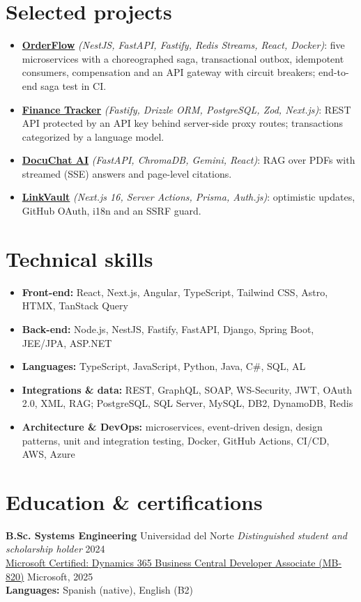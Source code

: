 \documentclass[10pt]{article}
\begin{document}
\section*{Selected projects}
\begin{itemize}
  \item \textbf{\href{https://github.com/MigueIAngel/orderflow}{OrderFlow}} \textit{(NestJS, FastAPI, Fastify, Redis Streams, React, Docker)}: five microservices with a choreographed saga, transactional outbox, idempotent consumers, compensation and an API gateway with circuit breakers; end-to-end saga test in CI.
  \item \textbf{\href{https://github.com/MigueIAngel/finance-tracker}{Finance Tracker}} \textit{(Fastify, Drizzle ORM, PostgreSQL, Zod, Next.js)}: REST API protected by an API key behind server-side proxy routes; transactions categorized by a language model.
  \item \textbf{\href{https://github.com/MigueIAngel/docuchat-ai}{DocuChat AI}} \textit{(FastAPI, ChromaDB, Gemini, React)}: RAG over PDFs with streamed (SSE) answers and page-level citations.
  \item \textbf{\href{https://github.com/MigueIAngel/linkvault}{LinkVault}} \textit{(Next.js 16, Server Actions, Prisma, Auth.js)}: optimistic updates, GitHub OAuth, i18n and an SSRF guard.
\end{itemize}

\section*{Technical skills}
\begin{itemize}
  \item \textbf{Front-end:} React, Next.js, Angular, TypeScript, Tailwind CSS, Astro, HTMX, TanStack Query
  \item \textbf{Back-end:} Node.js, NestJS, Fastify, FastAPI, Django, Spring Boot, JEE/JPA, ASP.NET
  \item \textbf{Languages:} TypeScript, JavaScript, Python, Java, C\#, SQL, AL
  \item \textbf{Integrations \& data:} REST, GraphQL, SOAP, WS-Security, JWT, OAuth 2.0, XML, RAG; PostgreSQL, SQL Server, MySQL, DB2, DynamoDB, Redis
  \item \textbf{Architecture \& DevOps:} microservices, event-driven design, design patterns, unit and integration testing, Docker, GitHub Actions, CI/CD, AWS, Azure
\end{itemize}

\section*{Education \& certifications}
\noindent\textbf{B.Sc. Systems Engineering} \textbar{} Universidad del Norte \textemdash{} \textit{Distinguished student and scholarship holder} \hfill 2024\\
\href{https://learn.microsoft.com/api/credentials/share/en-us/MiguelAltamar-5421/468B2D2A0F8511E3?sharingId=88DCDE63C9CD6D93}{Microsoft Certified: Dynamics 365 Business Central Developer Associate (MB-820)} \textemdash{} Microsoft, 2025\\
\textbf{Languages:} Spanish (native), English (B2)
\end{document}
